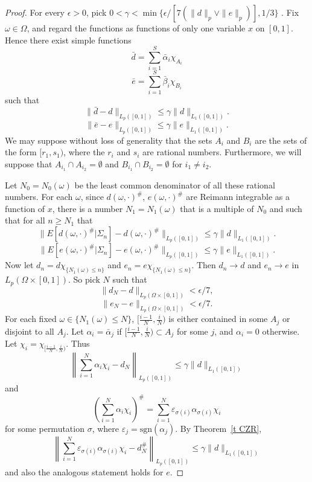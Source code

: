 \documentclass[12pt]{amsart}
\begin{document}
\begin{proof}
For every $\epsilon > 0$, pick $0 < \gamma < \min\{\epsilon /
[7(\|d\|_p \vee \|e\|_p)],1/3\}$ . Fix $\omega \in \Omega$, and
regard the functions as functions of only one variable $x$ on
$[0,1]$. Hence there exist simple functions
\[\bar{d}=\sum_{i=1}^S \bar{\alpha} _i\chi _{A_i}\]
\[\bar{e}=\sum_{i=1}^S \bar{\beta} _i\chi _{B_i}\]
such that
$$ \|\bar{d}- d\|_{L_p([0,1])}
   \le \gamma \| d \|_{L_1([0,1])}.$$
$$ \|\bar{e} - e\|_{L_p([0,1])}
   \le \gamma \| e \|_{L_1([0,1])}.$$
We may suppose without loss of generality that the sets $A_i$ and
$B_i$ are the sets of the form $[r_1,s_1)$, where the $r_i$ and
$s_i$ are rational numbers. Furthermore, we will suppose that
$A_{i_1} \cap A_{i_2} = \emptyset$ and $B_{i_1} \cap B_{i_2} =
\emptyset$ for $i_1 \ne i_2$.

Let $N_0=N_0(\omega)$ be the least common denominator of all these
rational numbers.  For each $\omega$, since $d(\omega,\cdot)^\#$,
$e(\omega,\cdot)^\#$ are Reimann integrable as a function of $x$,
there is a number $N_1=N_1(\omega)$ that is a multiple of $N_0$
and such that for all $n\ge N_1$ that
$$ \| E[d(\omega,\cdot)^\#|\Sigma_n] - d(\omega,\cdot)^\#\|_{L_p([0,1])}
   \le \gamma \| d \|_{L_1([0,1])}.$$
$$ \| E[e(\omega,\cdot)^\#|\Sigma_n] - e(\omega,\cdot)^\#\|_{L_p([0,1])}
   \le \gamma \| e \|_{L_1([0,1])}.$$
Now let $d_n = d \chi_{\{N_1(\omega) \le n\}}$ and $e_n = e
\chi_{\{N_1(\omega) \le n\}}$.  Then $d_n \to d$ and $e_n \to e$
in $L_p(\Omega\times[0,1])$.  So pick $N$ such that
$$\|d_N - d\|_{L_p(\Omega\times[0,1])} < \epsilon/7,$$
$$\|e_N - e\|_{L_p(\Omega\times[0,1])} < \epsilon/7.$$
For each fixed $\omega \in \{N_1(\omega) \le N\}$,
$[\frac{i-1}{N},\frac{i}{N})$ is either contained in some $A_j$ or
disjoint to all $A_j$. Let $\alpha_i=\bar{\alpha}_j$ if
$[\frac{i-1}{N},\frac{i}{N})\subset A_j$ for some $j$, and
$\alpha_i=0$ otherwise. Let $\chi
_i=\chi_{[\frac{i-1}{N},\frac{i}{N})}$. Thus
\begin{equation}
\label{approx-1} \left\|\sum_{i=1}^N \alpha _i\chi _i-d_N
\right\|_{L_p([0,1])} \leq \gamma \|d\|_{L_1([0,1])}
\end{equation}
and
\[
\left( \sum_{i=1}^N \alpha _i\chi _i\right)^\# = \sum_{i=1}^N
\varepsilon_{\sigma (i)}\alpha _{\sigma (i)}\chi _i
\]
for some permutation $\sigma $,  where $\varepsilon
_j=\mbox{sgn}(\alpha_j)$. By Theorem~\ref{t CZR},
\begin{equation}
\label{approx-3} \left\| \sum_{i=1}^N \varepsilon_{\sigma
(i)}\alpha _{\sigma (i)}\chi _i-d^\#_N \right\|_{L_p([0,1])} \le
\gamma \|d\|_{L_1([0,1])}
\end{equation}
and also the analogous statement holds for $e$.


\end{proof}
\end{document}

